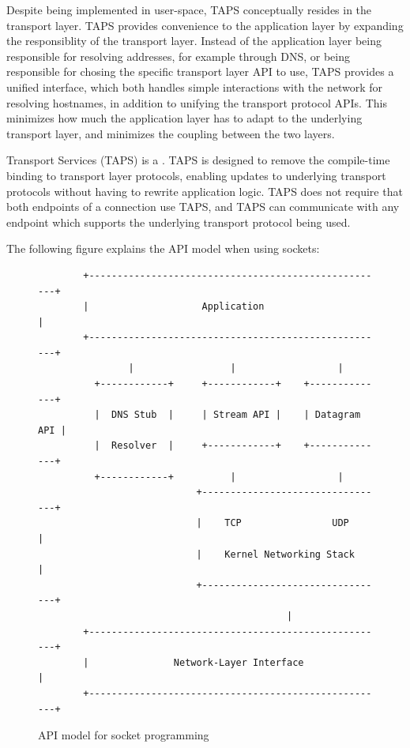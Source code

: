 Despite being implemented in user-space, TAPS conceptually resides
in the transport layer. TAPS provides convenience to the application
layer by expanding the responsiblity of the transport layer. Instead
of the application layer being responsible for resolving addresses,
for example through DNS, or being responsible for chosing the specific
transport layer API to use, TAPS provides a unified interface, which
both handles simple interactions with the network for resolving hostnames,
in addition to unifying the transport protocol APIs. This minimizes
how much the application layer has to adapt to the underlying transport
layer, and minimizes the coupling between the two layers.

Transport Services (TAPS) is a 
\cite{trammellAbstractApplicationProgramming2025}. TAPS is
designed to remove the compile-time binding to transport layer
protocols, enabling updates to underlying transport protocols
without having to rewrite application logic. TAPS does not
require that both endpoints of a connection use TAPS, and TAPS
can communicate with any endpoint which supports the underlying
transport protocol being used.

The following figure explains the API model when using
sockets: 

\begin{figure}[H]
    \centering
    \begin{lstlisting}
        +-----------------------------------------------------+
        |                    Application                      |
        +-----------------------------------------------------+
                |                 |                  |
          +------------+     +------------+    +--------------+
          |  DNS Stub  |     | Stream API |    | Datagram API |
          |  Resolver  |     +------------+    +--------------+
          +------------+          |                  |
                            +---------------------------------+
                            |    TCP                UDP       |
                            |    Kernel Networking Stack      |
                            +---------------------------------+
                                            |
        +-----------------------------------------------------+
        |               Network-Layer Interface               |
        +-----------------------------------------------------+
    \end{lstlisting}
    \caption{API model for socket programming \cite{trammellAbstractApplicationProgramming2025}}
\end{figure}

